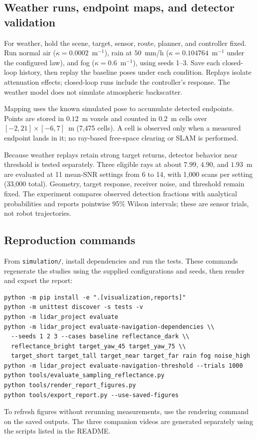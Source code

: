 \documentclass[11pt,letterpaper]{article}
\begin{document}
\subsection{Weather runs, endpoint maps, and detector validation}
For weather, hold the scene, target, sensor, route, planner, and controller fixed. Run normal air ($\kappa=0.0002$~m$^{-1}$), rain at $50$~mm/h ($\kappa=0.104764$~m$^{-1}$ under the configured law), and fog ($\kappa=0.6$~m$^{-1}$), using seeds 1--3. Save each closed-loop history, then replay the baseline poses under each condition. Replays isolate attenuation effects; closed-loop runs include the controller's response. The weather model does not simulate atmospheric backscatter.

Mapping uses the known simulated pose to accumulate detected endpoints. Points are stored in $0.12$~m voxels and counted in $0.2$~m cells over $[-2,21]\times[-6,7]$~m (7,475 cells). A cell is observed only when a measured endpoint lands in it; no ray-based free-space clearing or SLAM is performed.

Because weather replays retain strong target returns, detector behavior near threshold is tested separately. Three eligible rays at about $7.99$, $4.90$, and $1.93$~m are evaluated at 11 mean-SNR settings from 6 to 14, with 1,000 scans per setting (33,000 total). Geometry, target response, receiver noise, and threshold remain fixed. The experiment compares observed detection fractions with analytical probabilities and reports pointwise 95\% Wilson intervals; these are sensor trials, not robot trajectories.

\subsection{Reproduction commands}
From \texttt{simulation/}, install dependencies and run the tests. These commands regenerate the studies using the supplied configurations and seeds, then render and export the report:
\begin{verbatim}
python -m pip install -e ".[visualization,reports]"
python -m unittest discover -s tests -v
python -m lidar_project evaluate
python -m lidar_project evaluate-navigation-dependencies \\
  --seeds 1 2 3 --cases baseline reflectance_dark \\
  reflectance_bright target_yaw_45 target_yaw_75 \\
  target_short target_tall target_near target_far rain fog noise_high
python -m lidar_project evaluate-navigation-threshold --trials 1000
python tools/evaluate_sampling_reflectance.py
python tools/render_report_figures.py
python tools/export_report.py --use-saved-figures
\end{verbatim}
To refresh figures without rerunning measurements, use the rendering command on the saved outputs. The three companion videos are generated separately using the scripts listed in the README.
\end{document}
